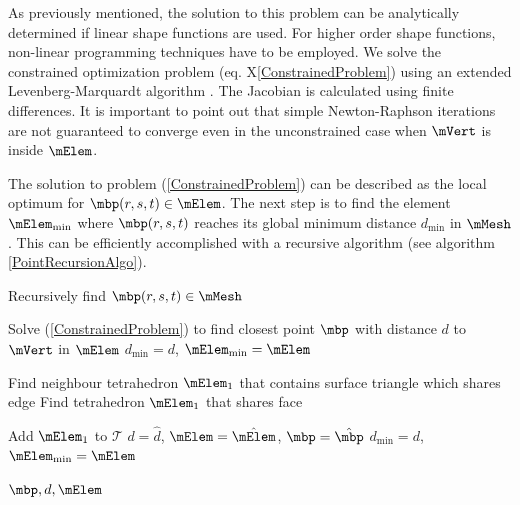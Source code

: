 As previously mentioned, the solution to this problem can be analytically determined if linear shape functions are used. For higher order shape functions, non-linear programming techniques have to be employed. We solve the constrained optimization problem (eq. X\ref{ConstrainedProblem}) using an extended Levenberg-Marquardt algorithm \cite{Nocedal1999} \cite{Kanzow2005}. The Jacobian is calculated using finite differences. It is important to point out that simple Newton-Raphson iterations are not guaranteed to converge even in the unconstrained case when $\mVert$ is inside $\mElem$.

The solution to problem (\ref{ConstrainedProblem}) can be described as the local optimum for $\mbp (r,s,t) \in \mElem$. The next step is to find the element $\mElem_{\min}$ where $\mbp (r,s,t)$ reaches its global minimum distance $d_{\min}$ in $\mMesh$. This can be efficiently accomplished with a recursive algorithm (see algorithm \ref{PointRecursionAlgo}).


\begin{algorithm}  
\caption{Recursively find $\mbp(r,s,t) \in \mMesh$}
\label{PointRecursionAlgo}
  \begin{algorithmic}
	\State Solve (\ref{ConstrainedProblem}) to find closest point $\mbp$ with distance $d$
	\State to $\mVert$ in $\mElem$
	\State $d_{\min} = d$, $\mElem_{\min} = \mElem$		
	\EndIf
	
				\State Find neighbour tetrahedron $\mElem_1$ that contains
				\State surface triangle which shares edge				
				\EndIf
		\Else			
			\State Find tetrahedron $\mElem_1$ that shares face

		\EndIf
	
	
				\State Add $\mElem_1$ to $\mathcal{T}$
				\State {} 	
				\State $d =  \hat d$, $\mElem = \hat{\mElem}$, ${\mbp} = { \hat \mbp}$				
				\State $d_{\min} = d$, $\mElem_{\min} = \mElem$		
				\EndIf
			\EndIf
			
			\EndIf
	
			\Return $\mbp,d, \mElem$
			\EndProcedure
		
  \end{algorithmic}
\end{algorithm}

